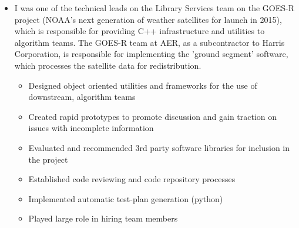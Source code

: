 \documentclass[11pt,a4paper,sans]{moderncv}        %
\begin{document}
\vspace{6pt}

\begin{itemize}

  \item{}

    I was one of the technical leads on the Library Services team on the GOES-R
    project (NOAA's next generation of weather satellites for launch in 2015),
    which is responsible for providing C++ infrastructure and utilities to
    algorithm teams. The GOES-R team at AER, as a subcontractor to Harris
    Corporation, is responsible for implementing the 'ground segment' software,
    which processes the satellite data for redistribution.

    \begin{itemize}
      \item{Designed object oriented utilities and frameworks for the use of downstream, algorithm teams}
      \item{Created rapid prototypes to promote discussion and gain traction on issues with incomplete information}
      \item{Evaluated and recommended 3rd party software libraries for inclusion in the project}
      \item{Established code reviewing and code repository processes}
      \item{Implemented automatic test-plan generation (python)}
      \item{Played large role in hiring team members}
    \end{itemize}

\end{itemize}


\vspace{6pt}
\end{document}
